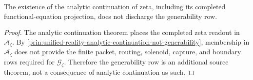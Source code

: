\begin{corollary}
\label{cor:unified-reality-projection-existence-generability-separate}
The existence of the analytic continuation of zeta, including its
completed functional-equation projection, does not discharge the
generability row.
\end{corollary}

\begin{proof}
The analytic continuation theorem places the completed zeta readout in
$\mathcal A_{\zeta}$.  By
\autoref{prin:unified-reality-analytic-continuation-not-generability},
membership in $\mathcal A_{\zeta}$ does not provide the finite packet,
routing, solenoid, capture, and boundary rows required for
$\mathcal G_{\zeta}$.  Therefore the generability row is an additional
source theorem, not a consequence of analytic continuation as such.
\end{proof}
